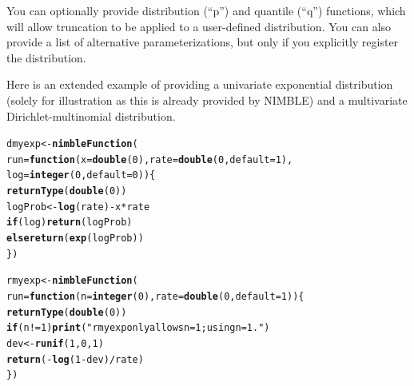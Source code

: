 \documentclass[12pt,oneside]{book}\usepackage[]{graphicx}\usepackage[]{color}
\makeatletter
\newcommand{\hlnum}[1]{\textcolor[rgb]{0.686,0.059,0.569}{#1}}%
\newcommand{\hlstr}[1]{\textcolor[rgb]{0.192,0.494,0.8}{#1}}%
\newcommand{\hlopt}[1]{\textcolor[rgb]{0,0,0}{#1}}%
\newcommand{\hlstd}[1]{\textcolor[rgb]{0.345,0.345,0.345}{#1}}%
\newcommand{\hlkwa}[1]{\textcolor[rgb]{0.161,0.373,0.58}{\textbf{#1}}}%
\newcommand{\hlkwb}[1]{\textcolor[rgb]{0.69,0.353,0.396}{#1}}%
\newcommand{\hlkwc}[1]{\textcolor[rgb]{0.333,0.667,0.333}{#1}}%
\newcommand{\hlkwd}[1]{\textcolor[rgb]{0.737,0.353,0.396}{\textbf{#1}}}%
\newenvironment{kframe}{%
 \def\at@end@of@kframe{}%
 \ifinner\ifhmode%
  \def\at@end@of@kframe{\end{minipage}}%
  \begin{minipage}{\columnwidth}%
 \fi\fi%
 \def\FrameCommand##1{\hskip\@totalleftmargin \hskip-\fboxsep
 \colorbox{shadecolor}{##1}\hskip-\fboxsep
     \hskip-\linewidth \hskip-\@totalleftmargin \hskip\columnwidth}%
 \MakeFramed {\advance\hsize-\width
   \@totalleftmargin\z@ \linewidth\hsize
   \@setminipage}}%
 {\par\unskip\endMakeFramed%
 \at@end@of@kframe}
\newenvironment{knitrout}{}{} %
\makeatother
\begin{document}
You can optionally provide distribution (``p'') and quantile (``q'')
functions, which will allow truncation to be applied to a user-defined
distribution.  You can also provide a list of alternative
parameterizations, but only if you explicitly register the distribution.

Here is an extended example of providing a univariate exponential
distribution (solely for illustration as this is already provided by NIMBLE) and a
multivariate Dirichlet-multinomial distribution.

\begin{knitrout}
\color{fgcolor}\begin{kframe}
\begin{alltt}
\hlstd{dmyexp} \hlkwb{<-} \hlkwd{nimbleFunction}\hlstd{(}
    \hlkwc{run} \hlstd{=} \hlkwa{function}\hlstd{(}\hlkwc{x} \hlstd{=} \hlkwd{double}\hlstd{(}\hlnum{0}\hlstd{),} \hlkwc{rate} \hlstd{=} \hlkwd{double}\hlstd{(}\hlnum{0}\hlstd{,} \hlkwc{default} \hlstd{=} \hlnum{1}\hlstd{),}
        \hlkwc{log} \hlstd{=} \hlkwd{integer}\hlstd{(}\hlnum{0}\hlstd{,} \hlkwc{default} \hlstd{=} \hlnum{0}\hlstd{)) \{}
        \hlkwd{returnType}\hlstd{(}\hlkwd{double}\hlstd{(}\hlnum{0}\hlstd{))}
        \hlstd{logProb} \hlkwb{<-} \hlkwd{log}\hlstd{(rate)} \hlopt{-} \hlstd{x}\hlopt{*}\hlstd{rate}
        \hlkwa{if}\hlstd{(log)} \hlkwd{return}\hlstd{(logProb)}
        \hlkwa{else} \hlkwd{return}\hlstd{(}\hlkwd{exp}\hlstd{(logProb))}
    \hlstd{\})}

\hlstd{rmyexp} \hlkwb{<-} \hlkwd{nimbleFunction}\hlstd{(}
    \hlkwc{run} \hlstd{=} \hlkwa{function}\hlstd{(}\hlkwc{n} \hlstd{=} \hlkwd{integer}\hlstd{(}\hlnum{0}\hlstd{),} \hlkwc{rate} \hlstd{=} \hlkwd{double}\hlstd{(}\hlnum{0}\hlstd{,} \hlkwc{default} \hlstd{=} \hlnum{1}\hlstd{)) \{}
        \hlkwd{returnType}\hlstd{(}\hlkwd{double}\hlstd{(}\hlnum{0}\hlstd{))}
        \hlkwa{if}\hlstd{(n} \hlopt{!=} \hlnum{1}\hlstd{)} \hlkwd{print}\hlstd{(}\hlstr{"rmyexp only allows n = 1; using n = 1."}\hlstd{)}
        \hlstd{dev} \hlkwb{<-} \hlkwd{runif}\hlstd{(}\hlnum{1}\hlstd{,} \hlnum{0}\hlstd{,} \hlnum{1}\hlstd{)}
        \hlkwd{return}\hlstd{(}\hlopt{-}\hlkwd{log}\hlstd{(}\hlnum{1}\hlopt{-}\hlstd{dev)} \hlopt{/} \hlstd{rate)}
    \hlstd{\})}


\end{alltt}
\end{kframe}
\end{knitrout}
\end{document}
